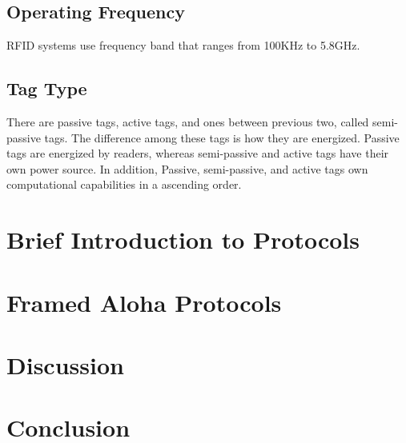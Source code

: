 \documentclass[12pt,letterpaper]{article}
\begin{document}
\subsection{Operating Frequency}
RFID systems use frequency band that ranges from 100KHz
to 5.8GHz\cite{survey}. 

\subsection{Tag Type}
There are passive tags, active tags, and ones between previous
two, called semi-passive tags. The difference among these tags
is how they are energized. Passive tags are energized by readers, 
whereas semi-passive and active tags have their own power source.
In addition, Passive, semi-passive, and active tags own computational
capabilities in a ascending order.

\section{Brief Introduction to Protocols}

\section{Framed Aloha Protocols}

\section{Discussion}

\section{Conclusion}


 
\end{document}
